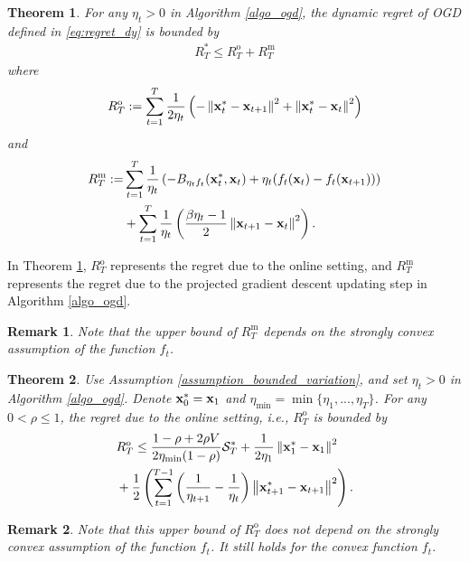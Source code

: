 \documentclass[journal]{IEEEtran}
\newtheorem{Theorem}{\bf{Theorem}}
\newtheorem{Remark}{\bf{Remark}}
\begin{document}
\begin{Theorem}
\label{theorem_high_level_regret}
For any $\eta_t >0$ in Algorithm \ref{algo_ogd}, the dynamic regret of OGD defined in \eqref{eq:regret_dy} is bounded by 
\begin{align}
\nonumber
R_T^{\ast} \le R^{\mathrm{o}}_T + R^{\mathrm{m}}_T
\end{align}  where \begin{align}
\nonumber
R^{\mathrm{o}}_T := \sum\limits_{t=1}^{T} \frac{1}{2\eta_t} \left(   -  \left\lVert{\bf x}_t^{\ast} - {\bf x}_{t+1}\right\rVert^2   + \left\lVert {\bf x}_t^{\ast} - {\bf x}_t \right\rVert^2  \right)
\end{align} and 
\begin{align}
\nonumber
R^{\mathrm{m}}_T := & \sum\limits_{t=1}^{T} \frac{1}{\eta_t} \left(  -B_{\eta_t f_t}({\bf x}_t^{\ast}, {\bf x}_t) + \eta_t (f_t({\bf x}_t) - f_t({\bf x}_{t+1})) \right) \\ \nonumber 
& + \sum\limits_{t=1}^{T} \frac{1}{\eta_t} \left( \frac{\beta \eta_t - 1}{2}\left\lVert{\bf x}_{t+1} - {\bf x}_t\right\rVert^2 \right).
\end{align}
\end{Theorem} 

In Theorem \ref{theorem_high_level_regret}, $R^{\mathrm{o}}_T$ represents the regret due to the online setting, and $R^{\mathrm{m}}_T$ represents the regret due to the projected gradient descent updating step in Algorithm \ref{algo_ogd}. 
\begin{Remark}
Note that the upper bound of $R^{\mathrm{m}}_T$ depends on the strongly convex assumption of the function $f_t$.  
\end{Remark}

\begin{Theorem}
\label{theorem_recurrsive_bound}
Use Assumption \ref{assumption_bounded_variation}, and set  $\eta_t>0$ in Algorithm \ref{algo_ogd}. Denote ${\bf x}_0^{\ast} = {\bf x}_1$ and $\eta_{\min} = \min\{\eta_1, ..., \eta_T\}$. For any  $0 < \rho \le 1$, the regret due to the online setting, i.e., $R^{\mathrm{o}}_T$ is bounded by 
\begin{align}
\nonumber
& R^{\mathrm{o}}_T   \le   \frac{1-\rho + 2\rho V}{2\eta_{\min}(1-\rho)} {\mathcal{S}}_T^{\ast} + \frac{1}{2\eta_1}\left\lVert{\bf x}_1^{\ast} - {\bf x}_1\right\rVert^2 \\ \nonumber
&  + \frac{1}{2}\left( \sum\limits_{t=1}^{T-1} \left( \frac{1}{\eta_{t+1}} - \frac{1}{\eta_t} \right) \left\lVert {\bf x}_{t+1}^{\ast} - {\bf x}_{t+1} \right\rVert^2     \right).
\end{align} 
\end{Theorem} 

\begin{Remark}
Note that this upper bound of $R^{\mathrm{o}}_T$ does not depend on the strongly convex assumption of the function $f_t$. It still holds for the convex function $f_t$. 
\end{Remark}
\end{document}
